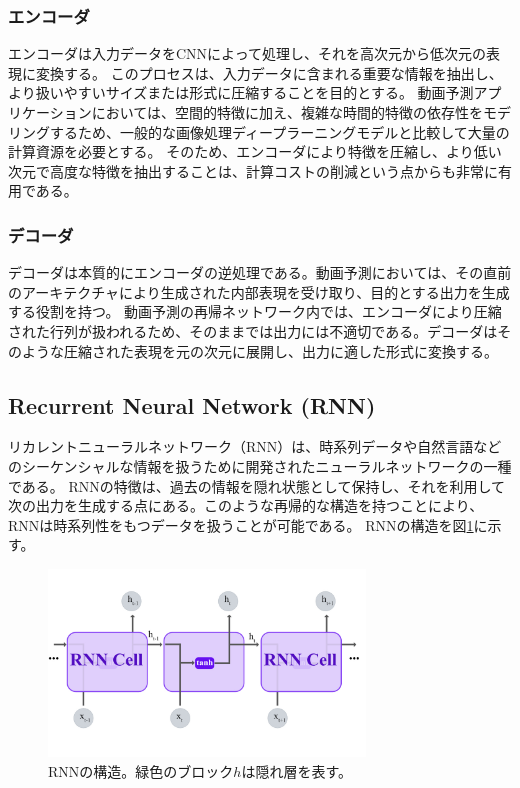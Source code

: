       \subsubsection{エンコーダ}
        エンコーダは入力データをCNNによって処理し、それを高次元から低次元の表現に変換する。
        このプロセスは、入力データに含まれる重要な情報を抽出し、より扱いやすいサイズまたは形式に圧縮することを目的とする。
        動画予測アプリケーションにおいては、空間的特徴に加え、複雑な時間的特徴の依存性をモデリングするため、一般的な画像処理ディープラーニングモデルと比較して大量の計算資源を必要とする。
        そのため、エンコーダにより特徴を圧縮し、より低い次元で高度な特徴を抽出することは、計算コストの削減という点からも非常に有用である。
        
      \subsubsection{デコーダ}
        デコーダは本質的にエンコーダの逆処理である。動画予測においては、その直前のアーキテクチャにより生成された内部表現を受け取り、目的とする出力を生成する役割を持つ。
        動画予測の再帰ネットワーク内では、エンコーダにより圧縮された行列が扱われるため、そのままでは出力には不適切である。デコーダはそのような圧縮された表現を元の次元に展開し、出力に適した形式に変換する。

    
    \subsection{Recurrent Neural Network (RNN)}
    リカレントニューラルネットワーク（RNN）は、時系列データや自然言語などのシーケンシャルな情報を扱うために開発されたニューラルネットワークの一種である。
    RNNの特徴は、過去の情報を隠れ状態として保持し、それを利用して次の出力を生成する点にある。このような再帰的な構造を持つことにより、RNNは時系列性をもつデータを扱うことが可能である。
    RNNの構造を図\ref{fig:rnn}に示す。
    \begin{figure}[htbp]
      \centering
      \includegraphics[width=0.75\textwidth]{figures/videoprediction/rnn.jpg}
      \caption{RNNの構造。緑色のブロック\( h \)は隠れ層を表す。}
      \label{fig:rnn}
    \end{figure}
    
